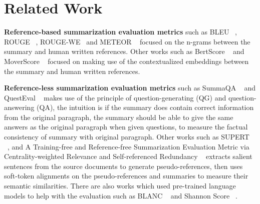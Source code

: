 \section{Related Work}
\textbf{Reference-based summarization evaluation metrics} such as BLEU ~\cite{bleu}, ROUGE ~\cite{rouge}, ROUGE-WE ~\cite{rougewe}and METEOR ~\cite{meteor} focused on the n-grams between the summary and human written references. Other works such as BertScore ~\cite{bertscore} and MoverScore ~\cite{moverscore} focused on making use of the contextualized embeddings between the summary and human written references.

\textbf{Reference-less summarization evaluation metrics} such as SummaQA ~\cite{summaqa} and QuestEval ~\cite{questeval} makes use of the principle of question-generating (QG) and question-answering (QA), the intuition is if the summary does contain correct information from the original paragraph, the summary should be able to give the same answers as the original paragraph when given questions, to measure the factual consistency of summary with original paragraph. Other works such as SUPERT ~\cite{supert}, and A Training-free and Reference-free Summarization Evaluation Metric via Centrality-weighted Relevance and Self-referenced Redundancy ~\cite {centrality} extracts salient sentences from the source documents to generate pseudo-references, then uses soft-token alignments on the pseudo-references and summaries to measure their semantic similarities. There are also works which used pre-trained language models to help with the evaluation such as BLANC ~\cite{blanc} and Shannon Score ~\cite{shannonscore}. 

